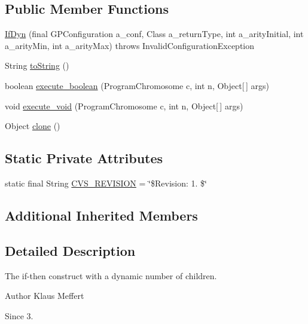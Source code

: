 \subsection*{Public Member Functions}
\begin{DoxyCompactItemize}
\item 
\hyperlink{classorg_1_1jgap_1_1gp_1_1function_1_1_if_dyn_a6cce1a585577682a94cf164e82958e10}{If\-Dyn} (final G\-P\-Configuration a\-\_\-conf, Class a\-\_\-return\-Type, int a\-\_\-arity\-Initial, int a\-\_\-arity\-Min, int a\-\_\-arity\-Max)  throws Invalid\-Configuration\-Exception 
\item 
String \hyperlink{classorg_1_1jgap_1_1gp_1_1function_1_1_if_dyn_a0270dbc1536052855603b277ed546f9a}{to\-String} ()
\item 
boolean \hyperlink{classorg_1_1jgap_1_1gp_1_1function_1_1_if_dyn_ac0d372e683b18c29d4cf7ce70758aa35}{execute\-\_\-boolean} (Program\-Chromosome c, int n, Object\mbox{[}$\,$\mbox{]} args)
\item 
void \hyperlink{classorg_1_1jgap_1_1gp_1_1function_1_1_if_dyn_ac7b9aee1521e3c567cfb36655376faf6}{execute\-\_\-void} (Program\-Chromosome c, int n, Object\mbox{[}$\,$\mbox{]} args)
\item 
Object \hyperlink{classorg_1_1jgap_1_1gp_1_1function_1_1_if_dyn_a75f5e475053cc10430f6f5dc03611ba0}{clone} ()
\end{DoxyCompactItemize}
\subsection*{Static Private Attributes}
\begin{DoxyCompactItemize}
\item 
static final String \hyperlink{classorg_1_1jgap_1_1gp_1_1function_1_1_if_dyn_a777f4f4f205eef04f5b5028f0cf433ab}{C\-V\-S\-\_\-\-R\-E\-V\-I\-S\-I\-O\-N} = \char`\"{}\$Revision\-: 1. \$\char`\"{}
\end{DoxyCompactItemize}
\subsection*{Additional Inherited Members}


\subsection{Detailed Description}
The if-\/then construct with a dynamic number of children.

\begin{DoxyAuthor}{Author}
Klaus Meffert 
\end{DoxyAuthor}
\begin{DoxySince}{Since}
3. 
\end{DoxySince}


